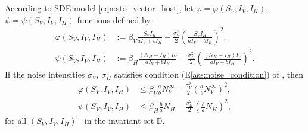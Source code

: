 %
%
%
%
\begin{proposition}\label{prp:quadratic_bound}
    According to SDE model \eqref{eqn:sto_vector_host},
    let $\varphi = \varphi (S_V, I_V, I_H)$, 
    $\psi = \psi (S_V, I_V, I_H)$ 
    functions defined by
    \begin{equation}
        \begin{aligned}
            \varphi (S_V, I_V, I_H) &:= 
                \beta_V \frac{S_V I_H}{a I_V + b I_H}
                - 
                \frac{\sigma_V ^ 2}{2} 
                \left(
                    \frac{S_V I_H}{a I_V + b I_H}
                \right) ^2,
            \\
            \psi (S_V, I_V, I_H) &:=
            \beta_H \frac{(N_H - I_H)  I_V}{a I_V + b I_H}
                - 
                \frac{\sigma_H ^ 2}{2} 
                \left(
                    \frac{(N_H - I_H)  I_V}{a I_V + b I_H}
                \right) ^2.
        \end{aligned}
    \end{equation}
    If the noise intensities $\sigma_V$, $\sigma_H$ satisfies condition 
    (E\textendash\ref{ass:noise_condition})
    of , then
    \begin{equation}
        \begin{aligned}
          \varphi (S_V, I_V, I_H) & \leq \beta_V \frac{a}{b} N_V ^ 
          {\infty}
         - \frac{\sigma_V ^ 2}{2}
          \left(
                  \frac{a}{b} N_V ^ {\infty}
              \right) ^ 2,
          \\
          \psi (S_V, I_V, I_H) & \leq
              \beta_H \frac{b}{a} N_H - \frac{\sigma_H ^ 2}{2}
              \left(
                  \frac{b}{a} N_H
              \right) ^ 2,
        \end{aligned}
    \end{equation}
    for all $(S_V, I_V, I_H)^{\top}$ in the invariant set $\mathbb{D}$.
\end{proposition}
%
